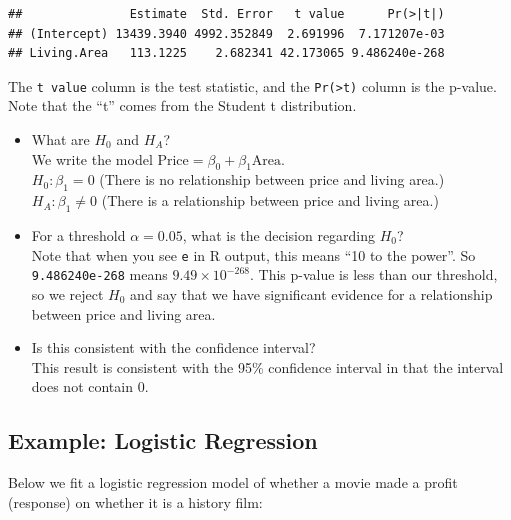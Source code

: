 \documentclass[]{book}
\newenvironment{Shaded}{\begin{snugshade}}{\end{snugshade}}
\newcommand{\CommentTok}[1]{\textcolor[rgb]{0.56,0.35,0.01}{\textit{#1}}}
\newcommand{\DataTypeTok}[1]{\textcolor[rgb]{0.13,0.29,0.53}{#1}}
\newcommand{\KeywordTok}[1]{\textcolor[rgb]{0.13,0.29,0.53}{\textbf{#1}}}
\newcommand{\NormalTok}[1]{#1}
\newcommand{\OperatorTok}[1]{\textcolor[rgb]{0.81,0.36,0.00}{\textbf{#1}}}
\newcommand{\OtherTok}[1]{\textcolor[rgb]{0.56,0.35,0.01}{#1}}
\newcommand{\StringTok}[1]{\textcolor[rgb]{0.31,0.60,0.02}{#1}}
\providecommand{\tightlist}{%
  \setlength{\itemsep}{0pt}\setlength{\parskip}{0pt}}
\begin{document}
\begin{verbatim}
##               Estimate  Std. Error   t value      Pr(>|t|)
## (Intercept) 13439.3940 4992.352849  2.691996  7.171207e-03
## Living.Area   113.1225    2.682341 42.173065 9.486240e-268
\end{verbatim}

The \texttt{t\ value} column is the test statistic, and the \texttt{Pr(\textgreater{}\textbar{}t\textbar{})} column is the p-value. Note that the ``t'' comes from the Student t distribution.

\begin{itemize}
\tightlist
\item
  What are \(H_0\) and \(H_A\)?\\
  We write the model \(\text{Price} = \beta_0 + \beta_1\text{Area}\).\\
  \(H_0: \beta_1 = 0\) (There is no relationship between price and living area.)\\
  \(H_A: \beta_1 \neq 0\) (There is a relationship between price and living area.)\\
\item
  For a threshold \(\alpha = 0.05\), what is the decision regarding \(H_0\)?\\
  Note that when you see \texttt{e} in R output, this means ``10 to the power''. So \texttt{9.486240e-268} means \(9.49 \times 10^{-268}\). This p-value is less than our threshold, so we reject \(H_0\) and say that we have significant evidence for a relationship between price and living area.
\item
  Is this consistent with the confidence interval?\\
  This result is consistent with the 95\% confidence interval in that the interval does not contain 0.
\end{itemize}

\hypertarget{example-logistic-regression}{%
\subsection{Example: Logistic Regression}\label{example-logistic-regression}}

Below we fit a logistic regression model of whether a movie made a profit (response) on whether it is a history film:

\begin{Shaded}
\end{Shaded}
\end{document}
